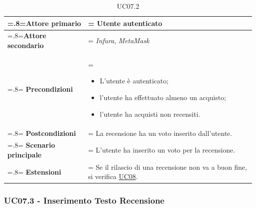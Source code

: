                 \begin{table}[H]
                    \centering
                    \renewcommand{\arraystretch}{1.8}
                    \renewcommand\tabularxcolumn[1]{m{#1}}
                    \begin{tabularx}{0.9\textwidth}{
                        >{\hsize=.8\hsize\linewidth=\hsize}X
                        >{\hsize=1.2\hsize\linewidth=\hsize}X}
                        \hline
                        \textbf{Attore primario} & Utente autenticato \\
                        \hline
                        \textbf{Attore secondario} & \textit{Infura}, \textit{MetaMask} \\
                        \hline
                        \textbf{Precondizioni} &
                            \begin{itemize}
                                \item L'utente è autenticato;
                                \item l'utente ha effettuato almeno un acquisto;
                                \item l'utente ha acquisti non recensiti.
                            \end{itemize} \\
                        \hline
                        \textbf{Postcondizioni} & La recensione ha un voto inserito dall'utente. \\
                        \hline
                        \textbf{Scenario principale} &
                        L'utente ha inserito un voto per la recensione. \\
                        \hline
                        \textbf{Estensioni} & Se il rilascio di una recensione non va a buon fine, si verifica \hyperref[UC08]{UC08}. \\
                        \hline
                    \end{tabularx}
                    \caption{UC07.2}
                \end{table}

            \subsubsection{UC07.3 - Inserimento Testo Recensione}
            \label{UC07.3}

